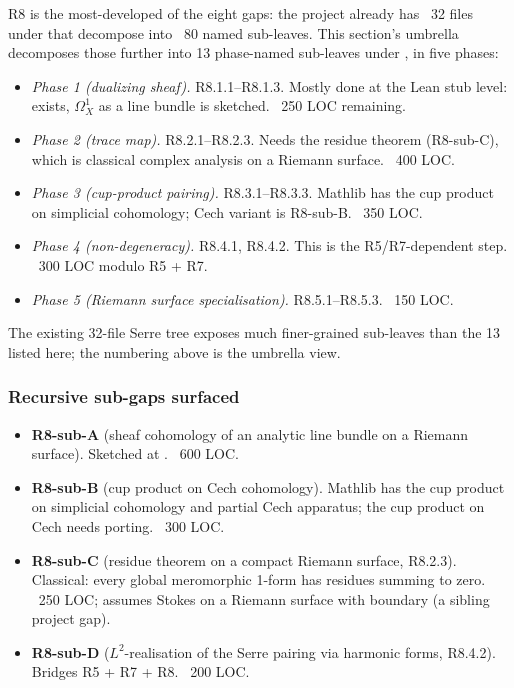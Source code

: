 R8 is the most-developed of the eight gaps: the project already has
~32 files under  that
decompose  into ~80 named sub-leaves.  This
section's umbrella decomposes those further into 13 phase-named
sub-leaves under , in
five phases:

\begin{itemize}
\item \emph{Phase 1 (dualizing sheaf).}  R8.1.1--R8.1.3.  Mostly
  done at the Lean stub level:  exists,
  \(\Omega^{1}_{X}\) as a line bundle is sketched.  ~250 LOC remaining.
\item \emph{Phase 2 (trace map).}  R8.2.1--R8.2.3.  Needs the
  residue theorem (R8-sub-C), which is classical complex analysis on
  a Riemann surface.  ~400 LOC.
\item \emph{Phase 3 (cup-product pairing).}  R8.3.1--R8.3.3.  Mathlib
  has the cup product on simplicial cohomology; Cech variant is
  R8-sub-B.  ~350 LOC.
\item \emph{Phase 4 (non-degeneracy).}  R8.4.1, R8.4.2.  This is the
  R5/R7-dependent step.  ~300 LOC modulo R5 + R7.
\item \emph{Phase 5 (Riemann surface specialisation).}
  R8.5.1--R8.5.3.  ~150 LOC.
\end{itemize}

The existing 32-file Serre tree exposes much finer-grained sub-leaves
than the 13 listed here; the numbering above is the umbrella view.

\subsubsection*{Recursive sub-gaps surfaced}

\begin{itemize}
\item \textbf{R8-sub-A} (sheaf cohomology of an analytic line bundle
  on a Riemann surface).  Sketched at
  .
  ~600 LOC.
\item \textbf{R8-sub-B} (cup product on Cech cohomology).  Mathlib
  has the cup product on simplicial cohomology and partial Cech
  apparatus; the cup product on Cech needs porting.  ~300 LOC.
\item \textbf{R8-sub-C} (residue theorem on a compact Riemann
  surface, R8.2.3).  Classical: every global meromorphic 1-form has
  residues summing to zero.  ~250 LOC; assumes Stokes on a Riemann
  surface with boundary (a sibling project gap).
\item \textbf{R8-sub-D} (\(L^2\)-realisation of the Serre pairing
  via harmonic forms, R8.4.2).  Bridges R5 + R7 + R8.  ~200 LOC.
\end{itemize}

